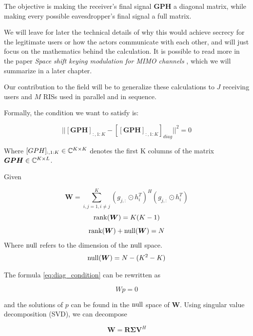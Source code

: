 The objective is making the receiver's final signal $\bm{GPH}$ a diagonal matrix, while making every possible eavesdropper's final signal a full matrix.

We will leave for later the technical details of why this would achieve secrecy for the legitimate users or how the actors communicate with each other, and will just focus on the mathematics behind the calculation. It is possible to read more in the paper \textit{Space shift keying modulation for MIMO channels} \cite{5165332}, which we will summarize in a later chapter.

Our contribution to the field will be to generalize these calculations to $J$ receiving users and $M$ RISs used in parallel and in sequence.

Formally, the condition we want to satisfy is:

\begin{equation}
  || [\bm{GPH}]_{:,1:K} - [[\bm{GPH}]_{:,1:K}]_{diag} || ^2 = 0
  \label{eq:diag_condition}
\end{equation}

Where $[GPH]_{:,1:K} \in \mathbb{C}^{K \times K}$ denotes the first K columns of the matrix $\bm{GPH} \in \mathbb{C}^{K \times L}$.

Given

\begin{equation}
  \bm{W} = \sum_{i,j = 1, i \ne j}^{K} (g_{j,:} \odot h_i^T)^H (g_{j,:} \odot h_i^T)
\end{equation}
\begin{equation}
  \operatorname{rank}(\bm{W}) = K(K-1)
\end{equation}
\begin{equation}
  \operatorname{rank}(\bm{W}) + \operatorname{null}(\bm{W}) = N
\end{equation}
Where $\operatorname{null}$ refers to the dimension of the $\operatorname{null}$ space.
\begin{equation}
  \operatorname{null}(\bm{W}) = N - (K^2 - K)
\end{equation}

The formula \eqref{eq:diag_condition} can be rewritten as

\begin{equation}Wp = 0\end{equation}

and the solutions of $p$ can be found in the $\operatorname{null}$ space of $\bm{W}$. Using singular value decomposition (SVD), we can decompose

\begin{equation}
  \bm{W} = \bm{R \Sigma V}^H
\end{equation}

